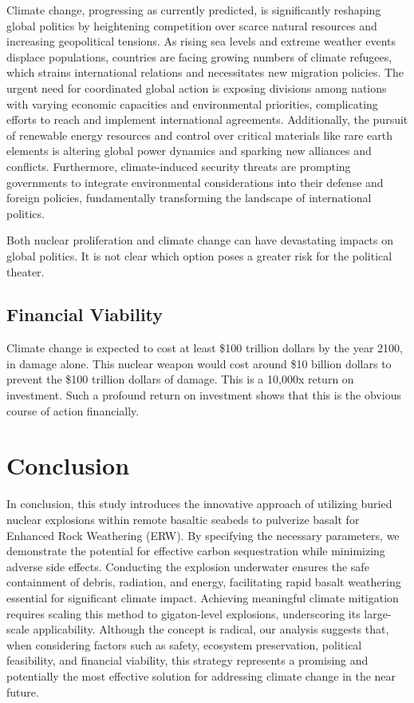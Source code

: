 \documentclass[11pt]{article}
\begin{document}
Climate change, progressing as currently predicted, is significantly reshaping global politics by heightening competition over scarce natural resources and increasing geopolitical tensions. As rising sea levels and extreme weather events displace populations, countries are facing growing numbers of climate refugees, which strains international relations and necessitates new migration policies. The urgent need for coordinated global action is exposing divisions among nations with varying economic capacities and environmental priorities, complicating efforts to reach and implement international agreements. Additionally, the pursuit of renewable energy resources and control over critical materials like rare earth elements is altering global power dynamics and sparking new alliances and conflicts. Furthermore, climate-induced security threats are prompting governments to integrate environmental considerations into their defense and foreign policies, fundamentally transforming the landscape of international politics.



Both nuclear proliferation and climate change can have devastating impacts on global politics. It is not clear which option poses a greater risk for the political theater.


\subsection{Financial Viability}
Climate change is expected to cost at least \$100 trillion dollars by the year 2100, in damage alone\citep{ipcc2018,stern2007,rockstrom2009}. This nuclear weapon would cost around \$10 billion dollars to prevent the \$100 trillion dollars of damage. This is a 10,000x return on investment. Such a profound return on investment shows that this is the obvious course of action financially.


\section{Conclusion}
In conclusion, this study introduces the innovative approach of utilizing buried nuclear explosions within remote basaltic seabeds to pulverize basalt for Enhanced Rock Weathering (ERW). By specifying the necessary parameters, we demonstrate the potential for effective carbon sequestration while minimizing adverse side effects. Conducting the explosion underwater ensures the safe containment of debris, radiation, and energy, facilitating rapid basalt weathering essential for significant climate impact. Achieving meaningful climate mitigation requires scaling this method to gigaton-level explosions, underscoring its large-scale applicability. Although the concept is radical, our analysis suggests that, when considering factors such as safety, ecosystem preservation, political feasibility, and financial viability, this strategy represents a promising and potentially the most effective solution for addressing climate change in the near future.



\bigskip


\end{document}
